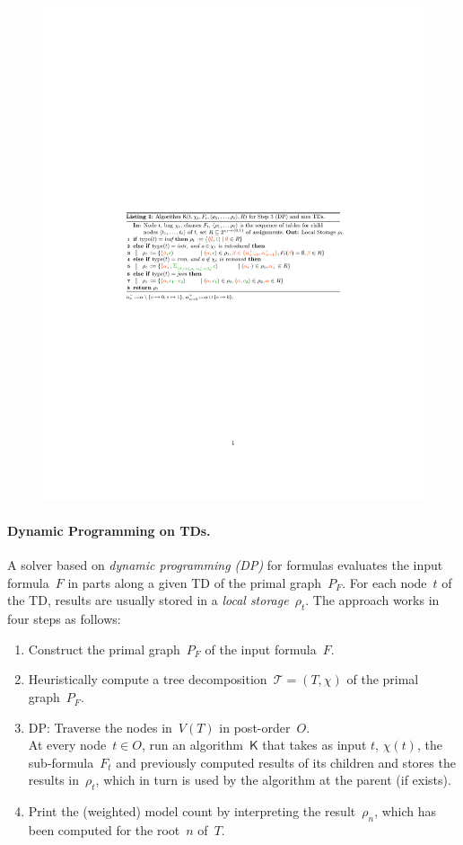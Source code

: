 \documentclass{llncs}
\newcommand{\TTT}{\mathcal{T}}
\newcommand{\algo}[1]{\ensuremath{\mathsf{#1}}}
\begin{document}
\begin{figure}[t]%
  {\noindent\includegraphics[trim={4.7cm 11.35cm 5cm 11.64cm},clip,page=1]{2-includes/prim.pdf}}
%
\end{figure}


\paragraph*{Dynamic Programming on TDs.} %
%
%
A solver based on \emph{dynamic programming (DP)} for formulas
evaluates the input formula~$F$ in parts along a given TD of the
primal graph~$P_F$.  For each node~$t$ of the TD, results are usually
stored in a \emph{local storage}~$\rho_t$.
%
The approach works in four steps as follows:
\begin{enumerate}%
\item Construct the primal graph~$P_F$ of the input formula~$F$.
\item Heuristically compute a tree decomposition~$\TTT=(T,\chi)$ of
  the primal graph~$P_F$.
\item\label{step:dp} DP: Traverse the nodes in~$V(T)$ in
  post-order~$O$.\\
  At every node~$t \in O$, run an algorithm~$\algo{K}$ that takes as input %
  $t$, $\chi(t)$, the sub-formula~$F_t$ and previously computed results of its
  children and stores the results in~$\rho_t$, which in turn is used by the algorithm at
  the parent (if exists). 
\item Print the (weighted) model count by interpreting the
  result~$\rho_n$, which has been computed for the root~$n$ of~$T$.
\end{enumerate}
\end{document}
